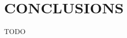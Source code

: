 \documentclass[aip
, pra
, showpacs
, aps
, twocolumn
, groupedaddress
, floatfix
]{revtex4}
\begin{document}
\section{CONCLUSIONS}
TODO


\begin{acknowledgments}
\end{acknowledgments}





%
\end{document}
